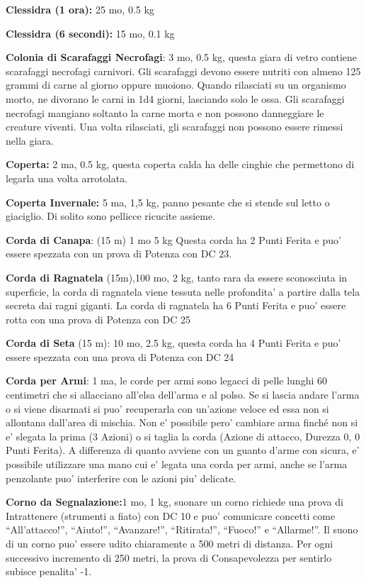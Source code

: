 \documentclass[a4paper,11pt,twoside,openany]{dndbook}
\begin{document}
{\textbf{Clessidra (1 ora):} 25 mo, 0.5 kg

\textbf{Clessidra (6 secondi):} 15 mo, 0.1 kg

\textbf{Colonia di Scarafaggi Necrofagi}: 3 mo, 0.5 kg, questa giara di vetro contiene scarafaggi necrofagi carnivori. Gli scarafaggi devono essere nutriti con almeno 125 grammi di carne al giorno oppure muoiono. Quando rilasciati su un organismo morto, ne divorano le carni in 1d4 giorni, lasciando solo le ossa. Gli scarafaggi necrofagi mangiano soltanto la carne morta e non possono danneggiare le creature viventi. Una volta rilasciati, gli scarafaggi non possono essere rimessi nella giara.

\textbf{Coperta:} 2 ma, 0.5 kg, questa coperta calda ha delle cinghie che permettono di legarla una volta arrotolata.

\textbf{Coperta Invernale:} 5 ma, 1,5 kg, panno pesante che si stende sul letto o giaciglio. Di solito sono pellicce ricucite assieme.

\textbf{Corda di Canapa}: (15 m) 1 mo 5 kg Questa corda ha 2 Punti Ferita e puo' essere spezzata con un prova di Potenza con DC 23.

\textbf{Corda di Ragnatela} (15m),100 mo, 2 kg, tanto rara da essere sconosciuta in superficie, la corda di ragnatela viene tessuta nelle profondita’ a partire dalla tela secreta dai ragni giganti.
La corda di ragnatela ha 6 Punti Ferita e puo' essere rotta con una prova di Potenza con DC 25

\textbf{Corda di Seta} (15 m): 10 mo, 2.5 kg, questa corda ha 4 Punti Ferita e puo' essere spezzata con una prova di Potenza con DC 24

\textbf{Corda per Armi}: 1 ma, le corde per armi sono legacci di pelle lunghi 60 centimetri che si allacciano all’elsa dell’arma e al polso. Se si lascia andare l’arma o si viene disarmati si puo' recuperarla con un’azione veloce ed essa non si allontana dall’area di mischia. Non e' possibile pero' cambiare arma finché non si e' slegata la prima (3 Azioni) o si taglia la corda (Azione di attacco, Durezza 0, 0 Punti Ferita). A differenza di quanto avviene con un guanto d’arme con sicura, e' possibile utilizzare una mano cui e' legata una corda per armi, anche se l’arma penzolante puo' interferire con le azioni piu' delicate.

\textbf{Corno da Segnalazione:}1 mo, 1 kg, suonare un corno richiede una prova di Intrattenere (strumenti a fiato) con DC 10 e puo' comunicare concetti come ``All'attacco!'', ``Aiuto!'', ``Avanzare!'', ``Ritirata!'', ``Fuoco!'' e ``Allarme!''. Il suono di un corno puo' essere udito chiaramente a 500 metri di distanza. Per ogni successivo incremento di 250 metri, la prova di Consapevolezza per sentirlo subisce penalita' -1.

}
\end{document}
